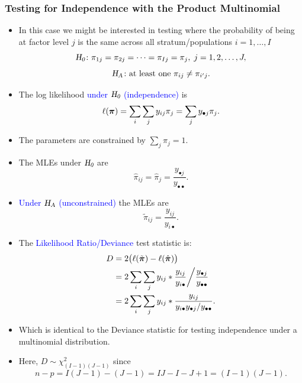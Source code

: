 \documentclass[oneside]{book}\usepackage[]{graphicx}\usepackage[svgnames]{xcolor}
\let\log\relax%
\newcommand{\HN}{\textsl{H}_{\textsl{0}}}%
\newcommand{\HA}{\textsl{H}_{\textsl{A}}}%
\providecommand{\Vector}[1]{\bm{#1}}%
\begin{document}
\subsubsection*{Testing for Independence with the Product Multinomial}
\begin{itemize}
      \item In this case we might be interested in testing where the probability of being at
            factor level $j$ is the same across all stratum/populations $ i=1,\ldots,I $
            \[ \HN\colon \pi_{1j}=\pi_{2j}=\cdots=\pi_{Ij}=\pi_j,\;j=1,2,\ldots,J, \]
            \[ \HA\colon \text{at least one }\pi_{ij}\ne \pi_{i^\prime j}. \]
      \item The log likelihood \textcolor{Blue}{under $ \HN $ (independence)} is
            \[ \ell(\Vector{\pi})=\sum_i\sum_j y_{ij}\log{\pi_{j}}=\sum_j y_{\bullet j}\log{\pi_{j}}. \]
      \item The parameters are constrained by $ \sum_{j}\pi_j=1 $.
      \item The MLEs under $ \HN $ are
            \[ \hat{\pi}_{ij}=\hat{\pi}_j=\frac{y_{\bullet j}}{y_{\bullet\bullet}}. \]
      \item \textcolor{Blue}{Under $ \HA $ (unconstrained)} the MLEs are
            \[ \tilde{\pi}_{ij}=\frac{y_{ij}}{y_{i\bullet}}. \]
      \item The \textcolor{Blue}{Likelihood Ratio/Deviance} test statistic is:
            \begin{align*}
                  D
                   & =2\bigl(\ell(\tilde{\Vector{\pi}})-\ell(\hat{\Vector{\pi}})\bigr)                                     \\
                   & =2\sum_i\sum_j y_{ij}\log*{\frac{y_{ij}}{y_{i\bullet}}\bigg/\frac{y_{\bullet j}}{y_{\bullet\bullet}}} \\
                   & =2\sum_i\sum_j y_{ij}\log*{\frac{y_{ij}}{y_{i\bullet}y_{\bullet j}/y_{\bullet\bullet}}}.
            \end{align*}
      \item Which is identical to the Deviance statistic for testing independence under a
            multinomial distribution.
      \item Here, $ D \sim \chi^2_{(I-1)(J-1)} $ since
            \[ n-p=I(J-1)-(J-1)=IJ-I-J+1=(I-1)(J-1). \]
\end{itemize}
\end{document}
